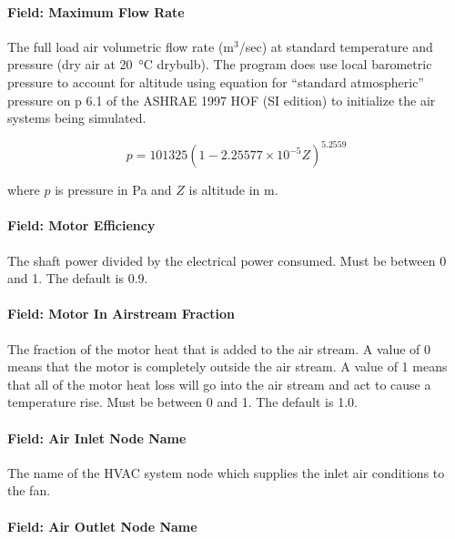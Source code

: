 \paragraph{Field: Maximum Flow Rate}\label{field-maximum-flow-rate-000}

The full load air volumetric flow rate (m\(^{3}\)/sec) at standard temperature and pressure (dry air at \SI{20}{\celsius} drybulb). The program does use local barometric pressure to account for altitude using equation for ``standard atmospheric'' pressure on p 6.1 of the ASHRAE 1997 HOF (SI edition) to initialize the air systems being simulated.

\begin{equation}
p = 101325 \left(1 - 2.25577 \times 10^{-5} Z\right)^{5.2559}
\end{equation}

where \(p\) is pressure in Pa and \(Z\) is altitude in m.

\paragraph{Field: Motor Efficiency}\label{field-motor-efficiency}

The shaft power divided by the electrical power consumed. Must be between 0 and 1. The default is 0.9.

\paragraph{Field: Motor In Airstream Fraction}\label{field-motor-in-airstream-fraction}

The fraction of the motor heat that is added to the air stream. A value of 0 means that the motor is completely outside the air stream. A value of 1 means that all of the motor heat loss will go into the air stream and act to cause a temperature rise. Must be between 0 and 1. The default is 1.0.

\paragraph{Field: Air Inlet Node Name}\label{field-air-inlet-node-name-002}

The name of the HVAC system node which supplies the inlet air conditions to the fan.

\paragraph{Field: Air Outlet Node Name}\label{field-air-outlet-node-name-002}

